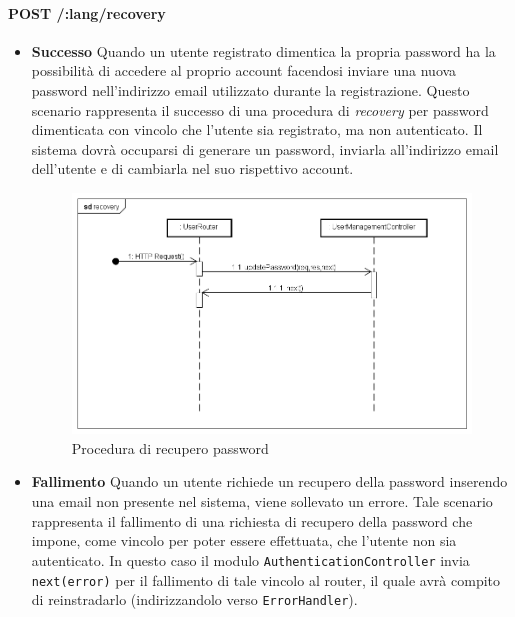 \paragraph{POST /:lang/recovery}
\begin{itemize}
\item \textbf{Successo}
Quando un utente registrato dimentica la propria password ha la possibilità di accedere al proprio account facendosi inviare una nuova password nell'indirizzo email utilizzato durante la registrazione. Questo scenario rappresenta il successo di una procedura di \textit{recovery} per password dimenticata con vincolo che l'utente sia registrato, ma non autenticato. Il sistema dovrà occuparsi di generare un password, inviarla all'indirizzo email dell'utente e di cambiarla nel suo rispettivo account.

\label{Procedura di recupero password}
\begin{figure}[ht]
	\centering
	\includegraphics[scale=0.40]{UML/DiagrammiDiSequenza/Back-end/POST__lang_recovery_success.png}
	\caption{Procedura di recupero password}
\end{figure}
\FloatBarrier

\item \textbf{Fallimento}
Quando un utente richiede un recupero della password inserendo una email non presente nel sistema, viene sollevato un errore. Tale scenario rappresenta il fallimento di una richiesta di recupero della password che impone, come vincolo per poter essere effettuata, che l'utente non sia autenticato. In questo caso il modulo \texttt{AuthenticationController} invia \texttt{next(error)} per il fallimento di tale vincolo al router, il quale avrà compito di reinstradarlo (indirizzandolo verso \texttt{ErrorHandler}).


\end{itemize}
